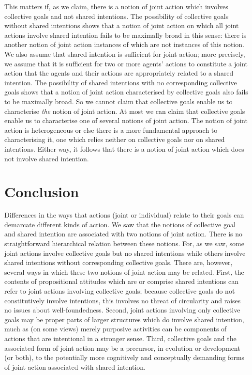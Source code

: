 \documentclass[12pt,a4paper]{extarticle}
\begin{document}
This matters if, as we claim, there is a notion of joint action which involves collective goals and not shared intentions.
The possibility of collective goals without shared intentions shows that a notion of joint action on which all joint actions involve shared intention fails to be maximally broad in this sense: there is another notion of joint action instances of which are not instances of this notion.
We also assume that shared intention is sufficient for joint action; more precisely, we assume that it is sufficient for two or more agents' actions to constitute a joint action that the agents and their actions are appropriately related to a shared intention.
The possibility of shared intentions with no corresponding collective goals shows that a notion of joint action characterised by collective goals also fails to be maximally broad.
So we cannot claim that collective goals enable us to characterise \emph{the} notion of joint action.
At most we can claim that collective goals enable us to characterise one of several notions of joint action.
The notion of joint action is heterogeneous or else there is a more fundamental approach to characterising it, one which relies neither on collective goals nor on shared intentions.
Either way, it follows that there is a notion of joint action which does not involve shared intention.

\section{Conclusion}
Differences in the ways that actions (joint or individual) relate to their goals can demarcate different kinds of action.
We saw that the notions of collective goal and shared intention are associated with two notions of joint action.
There is no straightforward hierarchical relation between these notions.  
For, as we saw, some joint actions involve collective goals but no shared intentions while others involve shared intentions without corresponding collective goals.  
There are, however, several ways in which these two notions of joint action may be related.
First, the contents of propositional attitudes which are or comprise shared intentions can refer to joint actions involving collective goals; because collective goals do not constitutively involve intentions, this involves no threat of circularity and raises no issues about well-foundedness.
Second, joint actions involving only collective goals may be proper parts of larger structures which do involve shared intention, much as (on some views) merely purposive activities can be components of actions that are intentional in a stronger sense.
Third, collective goals and the associated form of joint action may be a precursor, in evolution or development (or both), to the potentially more cognitively and conceptually demanding forms of joint action associated with shared intention.
\end{document}

